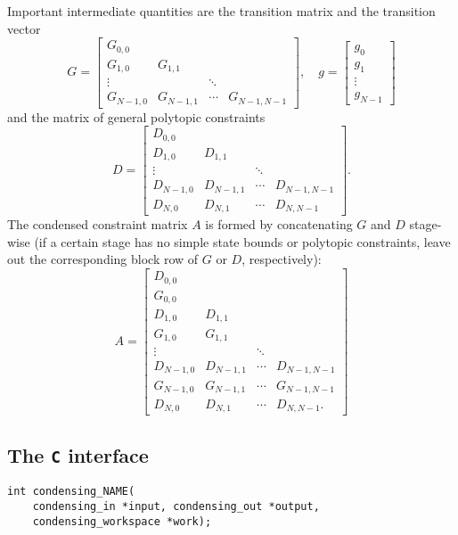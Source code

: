 \documentclass{report}
\begin{document}
Important intermediate quantities are the transition matrix and the transition vector
\begin{equation}
G = \begin{bmatrix}
G_{0,0} \\
G_{1,0} & G_{1,1} \\
\vdots & & \ddots \\
G_{N-1,0} & G_{N-1,1} & \cdots & G_{N-1,N-1}
\end{bmatrix}, \quad g = \begin{bmatrix}
g_0 \\
g_1 \\
\vdots \\
g_{N-1}
\end{bmatrix}
\end{equation}
and the matrix of general polytopic constraints
\begin{equation}
D = \begin{bmatrix}
D_{0,0} \\
D_{1,0} & D_{1,1} \\
\vdots & & \ddots \\
D_{N-1,0} & D_{N-1,1} & \cdots & D_{N-1,N-1} \\
D_{N,0} & D_{N,1} & \cdots & D_{N,N-1}
\end{bmatrix}.
\end{equation}
The condensed constraint matrix $A$ is formed by concatenating $G$ and $D$ stage-wise (if a certain stage has no simple state bounds or polytopic constraints, leave out the corresponding block row of $G$ or $D$, respectively):
\begin{equation}
A = \begin{bmatrix}
D_{0,0} \\
G_{0,0} \\
D_{1,0} & D_{1,1} \\
G_{1,0} & G_{1,1} \\
\vdots & & \ddots \\
D_{N-1,0} & D_{N-1,1} & \cdots & D_{N-1,N-1} \\
G_{N-1,0} & G_{N-1,1} & \cdots & G_{N-1,N-1} \\
D_{N,0} & D_{N,1} & \cdots & D_{N,N-1}.
\end{bmatrix}
\end{equation}

\subsection{The \texttt{C} interface}
\begin{verbatim}
int condensing_NAME(
    condensing_in *input, condensing_out *output, 
    condensing_workspace *work);
\end{verbatim}
\end{document}
